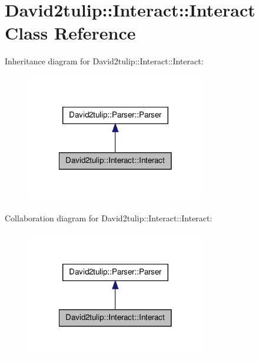 \hypertarget{classDavid2tulip_1_1Interact_1_1Interact}{
\section{\-David2tulip\-:\-:\-Interact\-:\-:\-Interact \-Class \-Reference}
\label{classDavid2tulip_1_1Interact_1_1Interact}
}


\-Inheritance diagram for \-David2tulip\-:\-:\-Interact\-:\-:\-Interact\-:\nopagebreak
\begin{figure}[H]
\begin{center}
\leavevmode
\includegraphics[width=222pt]{classDavid2tulip_1_1Interact_1_1Interact__inherit__graph}
\end{center}
\end{figure}


\-Collaboration diagram for \-David2tulip\-:\-:\-Interact\-:\-:\-Interact\-:\nopagebreak
\begin{figure}[H]
\begin{center}
\leavevmode
\includegraphics[width=222pt]{classDavid2tulip_1_1Interact_1_1Interact__coll__graph}
\end{center}
\end{figure}
